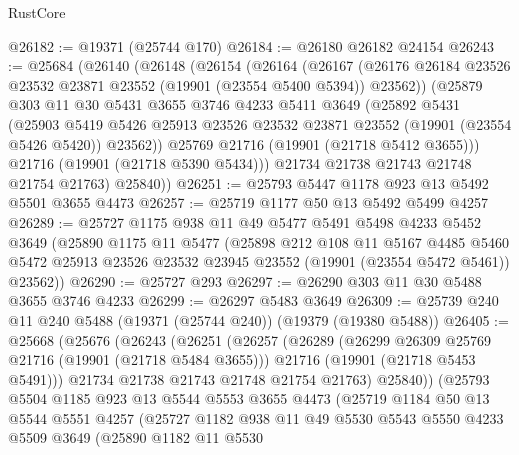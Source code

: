 \begin{lexlean}{RustCore}
\begin{coremodule}
@26182 := @19371 (@25744 @170)
@26184 := @26180 @26182 @24154
@26243 := @25684
    (@26140
      (@26148
        (@26154
          (@26164
            (@26167
              (@26176 @26184 @23526 @23532 @23871 @23552 (@19901 (@23554 @5400 @5394)) @23562))
            (@25879
              @303
              @11
              @30
              @5431
              @3655
              @3746
              @4233
              @5411
              @3649
              (@25892
                @5431
                (@25903
                  @5419
                  @5426
                  @25913
                  @23526
                  @23532
                  @23871
                  @23552
                  (@19901 (@23554 @5426 @5420))
                  @23562))
              @25769
              @21716
              (@19901 (@21718 @5412 @3655)))
            @21716
            (@19901 (@21718 @5390 @5434)))
          @21734
          @21738
          @21743
          @21748
          @21754
          @21763)
        @25840))
@26251 := @25793 @5447 @1178 @923 @13 @5492 @5501 @3655 @4473
@26257 := @25719 @1177 @50 @13 @5492 @5499 @4257
@26289 := @25727
    @1175
    @938
    @11
    @49
    @5477
    @5491
    @5498
    @4233
    @5452
    @3649
    (@25890
      @1175
      @11
      @5477
      (@25898
        @212
        @108
        @11
        @5167
        @4485
        @5460
        @5472
        @25913
        @23526
        @23532
        @23945
        @23552
        (@19901 (@23554 @5472 @5461))
        @23562))
@26290 := @25727 @293
@26297 := @26290 @303 @11 @30 @5488 @3655 @3746 @4233
@26299 := @26297 @5483 @3649
@26309 := @25739 @240 @11 @240 @5488 (@19371 (@25744 @240)) (@19379 (@19380 @5488))
@26405 := @25668
    (@25676
      (@26243
        (@26251
          (@26257
            (@26289
              (@26299 @26309 @25769 @21716 (@19901 (@21718 @5484 @3655)))
              @21716
              (@19901 (@21718 @5453 @5491)))
            @21734
            @21738
            @21743
            @21748
            @21754
            @21763)
          @25840))
      (@25793
        @5504
        @1185
        @923
        @13
        @5544
        @5553
        @3655
        @4473
        (@25719
          @1184
          @50
          @13
          @5544
          @5551
          @4257
          (@25727
            @1182
            @938
            @11
            @49
            @5530
            @5543
            @5550
            @4233
            @5509
            @3649
            (@25890
              @1182
              @11
              @5530

\end{coremodule}
\end{lexlean}
